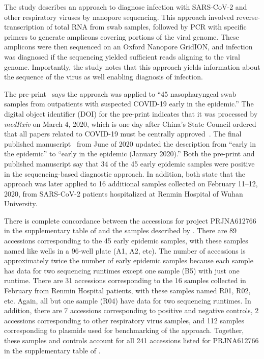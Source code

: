 \documentclass[9pt,twocolumn,twoside]{gsajnl_modified}
\begin{document}
The study describes an approach to diagnose infection with SARS-CoV-2 and other respiratory viruses by nanopore sequencing.
This approach involved reverse-transcription of total RNA from swab samples, followed by PCR with specific primers to generate amplicons covering portions of the viral genome.
These amplicons were then sequenced on an Oxford Nanopore GridION, and infection was diagnosed if the sequencing yielded sufficient reads aligning to the viral genome.
Importantly, the study notes that this approach yields information about the sequence of the virus as well enabling diagnosis of infection.

The pre-print~\citep{wang2020medRxiv} says the approach was applied to ``45 nasopharyngeal swab samples from outpatients with suspected COVID-19 early in the epidemic.''
The digital object identifier (DOI) for the pre-print indicates that it was processed by \textit{medRxiv} on March 4, 2020, which is one day after China's State Council ordered that all papers related to COVID-19 must be centrally approved~\citep{Kang2020}.
The final published manuscript~\citep{wang2020small} from June of 2020 updated the description from ``early in the epidemic'' to ``early in the epidemic (January 2020).''
Both the pre-print and published manuscript say that 34 of the 45 early epidemic samples were positive in the sequencing-based diagnostic approach.
In addition, both state that the approach was later applied to 16 additional samples collected on February 11--12, 2020, from SARS-CoV-2 patients hospitalized at Renmin Hospital of Wuhan University.

There is complete concordance between the accessions for project PRJNA612766 in the supplementary table of \citet{farkas2020insights} and the samples described by \citet{wang2020medRxiv}.
There are 89 accessions corresponding to the 45 early epidemic samples, with these samples named like wells in a 96-well plate (A1, A2, etc).
The number of accessions is approximately twice the number of early epidemic samples because each sample has data for two sequencing runtimes except one sample (B5) with just one runtime.
 There are 31 accessions corresponding to the 16 samples collected in February from Renmin Hospital patients, with these samples named R01, R02, etc.
 Again, all but one sample (R04) have data for two sequencing runtimes.
 In addition, there are 7 accessions corresponding to positive and negative controls, 2 accessions corresponding to other respiratory virus samples, and 112 samples corresponding to plasmids used for benchmarking of the approach.
 Together, these samples and controls account for all 241 accessions listed for PRJNA612766 in the supplementary table of \citet{farkas2020insights}.
\end{document}
